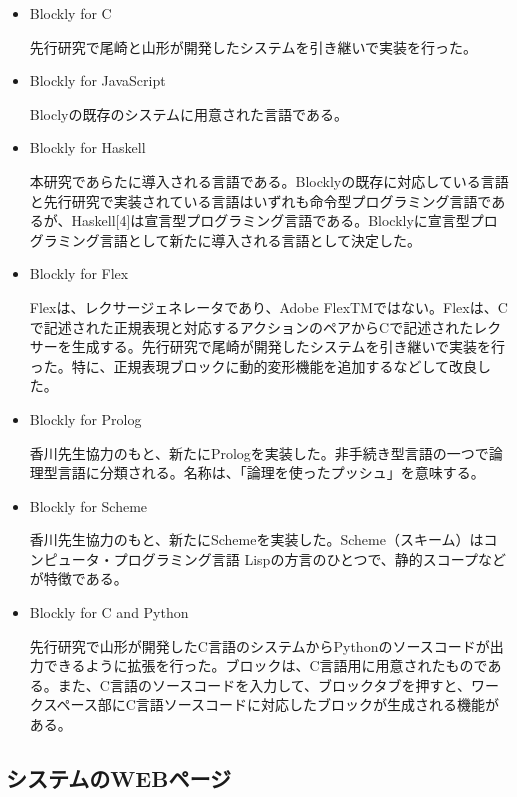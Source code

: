 \documentclass{risepaper}
\begin{document}
\begin{itemize}
\item Blockly for C

先行研究で尾崎と山形が開発したシステムを引き継いで実装を行った。

\item Blockly for JavaScript

Bloclyの既存のシステムに用意された言語である。

\item Blockly for Haskell

本研究であらたに導入される言語である。Blocklyの既存に対応している言語と先行研究で実装されている言語はいずれも命令型プログラミング言語であるが、Haskell[4]は宣言型プログラミング言語である。Blocklyに宣言型プログラミング言語として新たに導入される言語として決定した。

\item Blockly for Flex

Flex\cite{flex}は、レクサージェネレータであり、Adobe FlexTMではない。Flexは、Cで記述された正規表現と対応するアクションのペアからCで記述されたレクサーを生成する。先行研究で尾崎が開発したシステムを引き継いで実装を行った。特に、正規表現ブロックに動的変形機能を追加するなどして改良した。

\item Blockly for Prolog

香川先生協力のもと、新たにPrologを実装した。非手続き型言語の一つで論理型言語に分類される。名称は、「論理を使ったプッシュ」を意味する。

\item Blockly for Scheme

香川先生協力のもと、新たにSchemeを実装した。Scheme（スキーム）はコンピュータ・プログラミング言語 Lispの方言のひとつで、静的スコープなどが特徴である。

\item Blockly for C and Python

先行研究で山形が開発したC言語のシステムからPythonのソースコードが出力できるように拡張を行った。ブロックは、C言語用に用意されたものである。また、C言語のソースコードを入力して、ブロックタブを押すと、ワークスペース部にC言語ソースコードに対応したブロックが生成される機能がある。

\end{itemize} 
   
   \subsection{システムのWEBページ}
   
\end{document}

